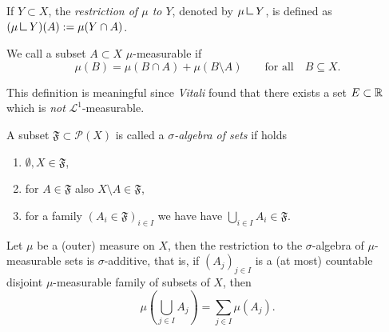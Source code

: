 \begin{definition} If $Y \subset X$, the
\emph{restriction of $\mu$ to $Y$}, denoted by $\mu \mres Y$,
is defined as $(\mu \mres Y)(A) := \mu(Y\cap A)$.
\end{definition}

\begin{definition}[$\mu$-measurable] We call a subset $A \subset X$
$\mu$-measurable if 
\[
\mu(B) = \mu(B\cap A) + \mu(B \setminus A)
\qquad \text{for all} \quad B \subseteq X.
\]
\end{definition}

\begin{remark}
This definition is meaningful since \emph{Vitali} found that there exists a set
$E \subset \mathbb{R}$ which is \emph{not} $\mathcal{L}^1$-measurable.
\end{remark}

\begin{definition}
A subset $\mathfrak{F} \subset \mathcal{P}(X)$ is called a \emph{$\sigma$-algebra of
sets} if holds
\begin{enumerate}[(1)]
\item $\emptyset,X \in \mathfrak{F}$,
\item for $A \in \mathfrak{F}$ also $X\setminus A \in \mathfrak{F}$,
\item for a family $(A_i \in \mathfrak{F})_{i\in I}$ we have 
have $\bigcup_{i\in I} A_i \in \mathfrak{F}$.
\end{enumerate}
\end{definition}

\begin{theorem}
Let $\mu$ be a (outer) measure on $X$, then the restriction to the
$\sigma$-algebra of $\mu$-measurable sets is $\sigma$-additive, that is, if
$(A_j)_{j\in I}$ is a (at most) countable disjoint $\mu$-measurable family of
subsets of $X$, then 
\[
\mu\left(\bigcup_{j \in I} A_j\right) = \sum_{j\in I} \mu\left(A_j\right).
\]
\end{theorem}


